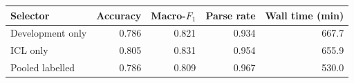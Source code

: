 \begin{tabular}{@{}lrrrr@{}}
\toprule
Selector & Accuracy & Macro-$F_1$ & Parse rate & Wall time (min) \\
\midrule
Development only & 0.786 & 0.821 & 0.934 & 667.7 \\
ICL only & 0.805 & 0.831 & 0.954 & 655.9 \\
Pooled labelled & 0.786 & 0.809 & 0.967 & 530.0 \\
\bottomrule
\end{tabular}